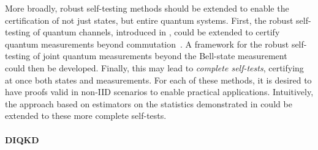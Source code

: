 \medbreak

More broadly, robust self-testing methods should be extended to enable the certification of not just states, but entire quantum systems.
First, the robust self-testing of quantum channels, introduced in \cite{Sekatski2018}, could be extended to certify quantum measurements beyond commutation~\cite{Kaniewski2017}.
A framework for the robust self-testing of joint quantum measurements beyond the Bell-state measurement~\cite{Bancal2018,Renou2018} could then be developed.
Finally, this may lead to \textit{complete self-tests}, certifying at once both states and measurements.
For each of these methods, it is desired to have proofs valid in non-IID scenarios to enable practical applications.
Intuitively, the approach based on estimators on the statistics demonstrated in \cite{Bancal2021} could be extended to these more complete self-tests. 



\paragraph{DIQKD}

